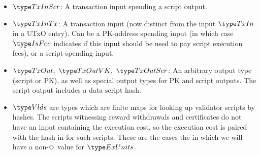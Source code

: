 \begin{itemize}
  \item $\TxInScr$: A transaction input spending a script output.

  \item $\TxInTx$: A transaction input (now distinct from the input $\TxIn$ in
  a UTxO entry). Can be a PK-address spending input
  (in which case $\IsFee$ indicates if this input should be used to pay script execution
  fees), or a script-spending input.

  \item $\TxOut,~\TxOutVK,~\TxOutScr$: An arbitrary output type (script or PK),
  as well as special output types for PK and script outputs. The script output
  includes a data script hash.

  \item $\Vlds$ are types which are finite maps for looking up
  validator scripts by hashes. The scripts witnessing reward withdrawals and
  certificates
  do not have an input containing the execution cost, so the execution cost
  is paired with the hash in for such scripts. These are the cases the in which we
  will have a non-$\Diamond$ value for $\ExUnits$.
\end{itemize}


